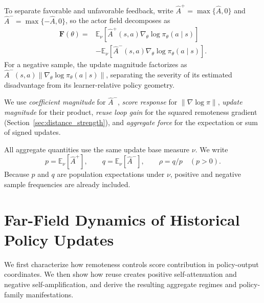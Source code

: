 \documentclass[sigconf,anonymous,review]{acmart}
\theoremstyle{acmdefinition}
\begin{document}
To separate favorable and unfavorable feedback, write
\(\widehat A^{+}=\max\{\widehat A,0\}\) and
\(\widehat A^{-}=\max\{-\widehat A,0\}\), so the actor field decomposes as
\begin{equation}
\begin{aligned}
    \mathbf{F}(\theta)
    ={}&
    \mathbb{E}_{\nu}
    \left[
        \widehat{A}^{+}(s,a)
        \nabla_\theta \log \pi_\theta(a \mid s)
    \right] \\
    &-
    \mathbb{E}_{\nu}
    \left[
        \widehat{A}^{-}(s,a)
        \nabla_\theta \log \pi_\theta(a \mid s)
    \right].
\end{aligned}
\label{eq:signed_actor_decomposition}
\end{equation}
For a negative sample, the update magnitude factorizes as
$\widehat{A}^{-}(s,a)
\lVert\nabla_\theta \log \pi_\theta(a \mid s)\rVert$,
separating the severity of its estimated disadvantage from its
learner-relative policy geometry.

We use \emph{coefficient magnitude} for \(\widehat A^-\), \emph{score
response} for \(\|\nabla\log\pi\|\), \emph{update magnitude} for their
product, \emph{reuse loop gain} for the squared remoteness gradient
(Section~\ref{sec:distance_strength}), and \emph{aggregate force} for the
expectation or sum of signed updates.

All aggregate quantities use the same update base measure \(\nu\). We write
\begin{equation}
    p=\mathbb E_\nu[\widehat A^+],
    \qquad
    q=\mathbb E_\nu[\widehat A^-],
    \qquad
    \rho=q/p \quad (p>0).
    \label{eq:aggregate_masses}
\end{equation}
Because \(p\) and \(q\) are population expectations under \(\nu\), positive
and negative sample frequencies are already included.

\section{Far-Field Dynamics of Historical Policy Updates}
\label{sec:theory}

We first characterize how remoteness controls score contribution in
policy-output coordinates. We then show how reuse creates positive
self-attenuation and negative self-amplification, and derive the resulting
aggregate regimes and policy-family manifestations.
\end{document}
